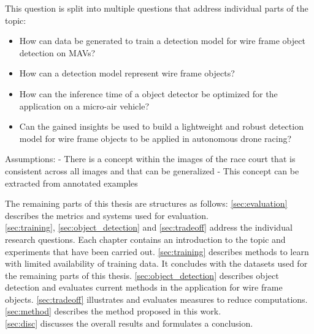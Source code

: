 This question is split into multiple questions that address individual parts of the topic:

\begin{itemize}
	\item How can data be generated to train a detection model for wire frame object detection on \acp{MAV}?
	\item How can a detection model represent wire frame objects?
	\item How can the inference time of a object detector be optimized for the application on a micro-air vehicle?
	\item Can the gained insights be used to build a lightweight and robust detection model for wire frame objects to be applied in autonomous drone racing?
\end{itemize}

Assumptions:
- There is a concept within the images of the race court that is consistent across all images and that can be generalized
- This concept can be extracted from annotated examples

The remaining parts of this thesis are structures as follows: \autoref{sec:evaluation} describes the metrics and systems used for evaluation.\\
 \autoref{sec:training}, \autoref{sec:object_detection} and \autoref{sec:tradeoff} address the individual research questions. Each chapter contains an introduction to the topic and experiments that have been carried out. \autoref{sec:training} describes methods to learn with limited availability of training data. It concludes with the datasets used for the remaining parts of this thesis.  \autoref{sec:object_detection} describes object detection and evaluates current methods in the application for wire frame objects.
\autoref{sec:tradeoff} illustrates and evaluates measures to reduce computations.
\autoref{sec:method} describes the method proposed in this work.\\
\autoref{sec:disc} discusses the overall results and formulates a conclusion.
